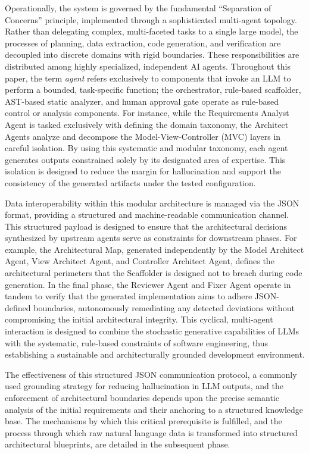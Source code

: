Operationally, the system is governed by the fundamental ``Separation of Concerns'' principle, implemented through a sophisticated multi-agent topology. Rather than delegating complex, multi-faceted tasks to a single large model, the processes of planning, data extraction, code generation, and verification are decoupled into discrete domains with rigid boundaries. These responsibilities are distributed among highly specialized, independent AI agents. Throughout this paper, the term \textit{agent} refers exclusively to components that invoke an LLM to perform a bounded, task-specific function; the orchestrator, rule-based scaffolder, AST-based static analyzer, and human approval gate operate as rule-based control or analysis components. For instance, while the Requirements Analyst Agent is tasked exclusively with defining the domain taxonomy, the Architect Agents analyze and decompose the Model-View-Controller (MVC) layers in careful isolation. By using this systematic and modular taxonomy, each agent generates outputs constrained solely by its designated area of expertise. This isolation is designed to reduce the margin for hallucination and support the consistency of the generated artifacts under the tested configuration.

Data interoperability within this modular architecture is managed via the JSON format, providing a structured and machine-readable communication channel. This structured payload is designed to ensure that the architectural decisions synthesized by upstream agents serve as constraints for downstream phases. For example, the Architectural Map, generated independently by the Model Architect Agent, View Architect Agent, and Controller Architect Agent, defines the architectural perimeters that the Scaffolder is designed not to breach during code generation. In the final phase, the Reviewer Agent and Fixer Agent operate in tandem to verify that the generated implementation aims to adhere JSON-defined boundaries, autonomously remediating any detected deviations without compromising the initial architectural integrity. This cyclical, multi-agent interaction is designed to combine the stochastic generative capabilities of LLMs with the systematic, rule-based constraints of software engineering, thus establishing a sustainable and architecturally grounded development environment.

The effectiveness of this structured JSON communication protocol, a commonly used grounding strategy for reducing hallucination in LLM outputs, and the enforcement of architectural boundaries depends upon the precise semantic analysis of the initial requirements and their anchoring to a structured knowledge base. The mechanisms by which this critical prerequisite is fulfilled, and the process through which raw natural language data is transformed into structured architectural blueprints, are detailed in the subsequent phase.

